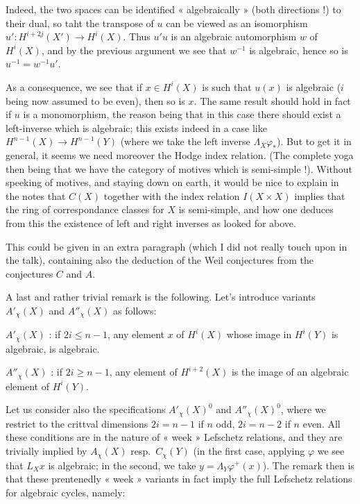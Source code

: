 \documentclass[11pt,a4paper]{article}
\begin{document}
Indeed, the two spaces can be identified « algebraically » (both directions !)
to their dual, so taht the transpose of $u$ can be viewed as an isomorphism
$u' : H^{i+2j}(X') \to H^{i}(X)$. Thus $u'u$ is an algebraic automorphism $w$ of
$H^{i}(X)$, and by the previous argument we see that $w^{-1}$ is algebraic,
hence so is $u^{-1} = w^{-1}u'$.

As a consequence, we see that if $x \in H^{i}(X)$ is such that $u(x)$ is
algebraic ($i$ being now assumed to be even), then so is $x$. The same result
should hold in fact if $u$ is a monomorphism, the reason being that in this case
there should exist a left-inverse which is algebraic; this exists indeed in a
case like $H^{n-1}(X) \to H^{n-1}(Y)$ (where we take the left inverse
$\Lambda_{X}\varphi_{*}$). But to get it in general, it seems we need moreover
the Hodge index relation. (The complete yoga then being that we have the
category of motives which is semi-simple !). Without speeking of motives, and
staying down on earth, it would be nice to explain in the notes that $C(X)$
together with the index relation $I(X \times X)$ implies that the ring of
correspondance classes for $X$ is semi-simple, and how one deduces from this the
existence of left and right inverses as looked for above.


This could be given in an extra paragraph (which I did not really touch upon in
the talk), containing also the deduction of the Weil conjectures from the
conjectures $C$ and $A$.

A last and rather trivial remark is the following. Let's introduce
 variants $A'_{\chi}(X)$ and $A''_{\chi}(X)$ as follows:

$A'_{\chi}(X)$ : if $2i \leq n-1$, any element $x$ of $H^{i}(X)$ whose image in
$H^{i}(Y)$ is algebraic, is algebraic.

$A''_{\chi}(X)$ : if $2i \geq n-1$, any  element  of $H^{i+2}(X)$
is  the image of an algebraic element of $H^{i}(Y)$.

Let us consider also the specifications $A'_{\chi}(X)^{0}$ and
$A''_{\chi}(X)^{0}$, where we restrict to the crittval dimensions $2i = n-1$ if
$n$ odd, $2i = n-2$ if $n$ even. All these conditions are in the nature of
« week » Lefschetz relations, and they are trivially implied by $A_{\chi}(X)$
resp.\ $C_{\chi}(Y)$ (in the first case, applying $\varphi$ we see that
$L_{X}x$ is algebraic; in the second, we take $y = \Lambda_{Y}\varphi^{+}(x)$).
The remark then is that these prentenedly « week » variants in fact imply the
full Lefschetz relations for algebraic cycles, namely:
\end{document}

